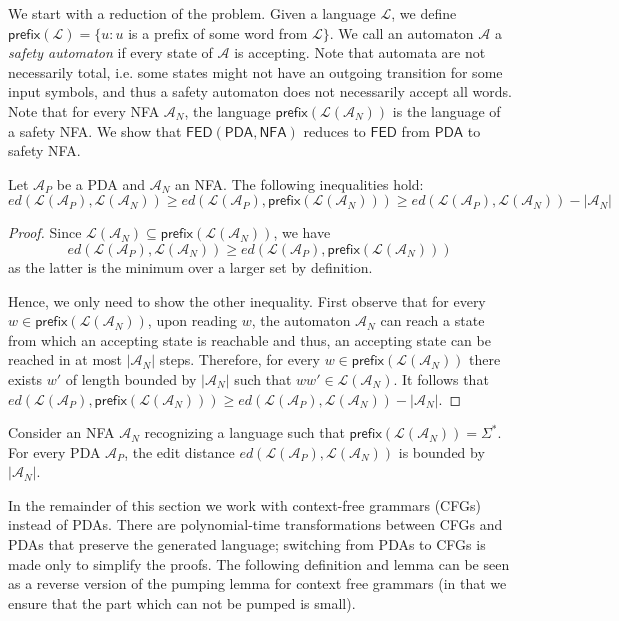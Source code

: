 \documentclass{CSML}
\newcommand{\aut}{\mathcal{A}}
\newcommand{\NFA}{\mathsf{NFA}}
\newcommand{\PDA}{\mathsf{PDA}}
\newcommand{\FED}{\mathsf{FED}}
\newcommand{\lang}{\mathcal{L}}
\newcommand{\prefix}[1]{\textsf{prefix}(#1)}
\newcommand{\ed}{ed}
\begin{document}
We start with a reduction of the problem. 
Given a language $\lang$, we define 
$\prefix{\lang} = \{ u : u$ is a prefix of some word from $\lang \}$.
We call an automaton $\aut$ a \emph{safety automaton} if every state of $\aut$ is accepting. 
Note that automata are not necessarily total, i.e. some states might not have an outgoing transition for some input symbols, and thus a safety automaton does not necessarily accept all words.
Note that for every NFA $\aut_N$, the language $\prefix{\lang({\aut_N})}$ is the language of a safety NFA.
We show that $\FED(\PDA, \NFA)$ reduces to $\FED$ from $\PDA$ to safety NFA. 

\begin{lem}\label{lem:prefix_closure}
Let $\aut_P$ be a PDA and $\aut_N$ an NFA. The following inequalities 
hold: 
\[\ed(\lang({\aut_P}),\lang({\aut_N}))\geq \ed(\lang({\aut_P}),\prefix{\lang({\aut_N}))} \geq \ed(\lang({\aut_P}),\lang({\aut_N})) - |\aut_N|\]
\end{lem}
\begin{proof}
Since $\lang({\aut_N}) \subseteq \prefix{\lang({\aut_N})}$, we have 
\[\ed(\lang({\aut_P}),\lang({\aut_N})) \geq \ed(\lang({\aut_P}),\prefix{\lang({\aut_N})})\] as the latter is the minimum over a larger set by definition. 

Hence, we only need to show the other inequality.
First observe that for every $w \in \prefix{\lang({\aut_N})}$, upon reading $w$, the automaton $\aut_N$ can reach a state from which an accepting state is reachable and thus, an accepting state can be 
reached in at most $|\aut_N|$ steps. 
Therefore, for every $w \in \prefix{\lang({\aut_N})}$ there exists $w'$ of length bounded by $|\aut_N|$ such that 
$w w' \in \lang({\aut_N})$. It follows that $\ed(\lang({\aut_P}),\prefix{\lang({\aut_N})}) \geq \ed(\lang({\aut_P}),\lang({\aut_N})) - |\aut_N|$.
\end{proof}

\begin{rem}
Consider an NFA $\aut_N$ recognizing a language such that $\prefix{\lang(\aut_N)} = \Sigma^*$.
For every PDA $\aut_P$, the edit distance $\ed(\lang(\aut_P), \lang(\aut_N))$ is bounded by $|\aut_N|$.
\end{rem}



In the remainder of this section we work with context-free grammars (CFGs) instead of PDAs. There are polynomial-time transformations between CFGs and PDAs that preserve the generated language;
switching from PDAs to CFGs is made only to simplify the proofs. 
The following definition and lemma can be seen as a reverse version of the pumping lemma for context free grammars (in that we ensure that the part which can not be pumped is small). 
\end{document}
